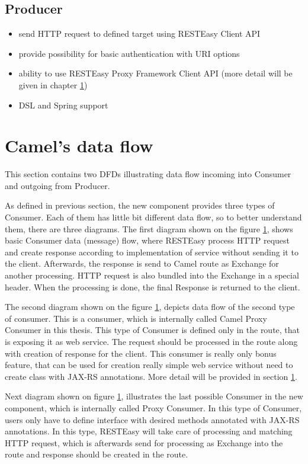 \documentclass[12pt,final,oneside]{fithesis2}
\begin{document}
\subsection{Producer}
\begin{itemize}
\item
send HTTP request to defined target using RESTEasy Client API

\item
provide possibility for basic authentication with URI options

\item
ability to use RESTEasy Proxy Framework Client API (more detail will be given in chapter \ref{})

\item
DSL and Spring support
\end{itemize}

\section{Camel's data flow}
This section contains two DFDs illustrating data flow incoming into Consumer and outgoing from Producer. 

As defined in previous section, the new component provides three types of Consumer. Each of them has little bit different data flow, so to better understand them, there are three diagrams. The first diagram shown on the figure \ref{}, shows basic Consumer data (message) flow, where RESTEasy process HTTP request and create response according to implementation of service without sending it to the client. Afterwards, the response is send to Camel route as Exchange for another processing. HTTP request is also bundled into the Exchange in a special header. When the processing  is done, the final Response is returned to the client. 

The second diagram shown on the figure \ref{}, depicts data flow of the second type of consumer. This is a consumer, which is internally called Camel Proxy Consumer in this thesis. This type of Consumer is defined only in the route, that is exposing it as web service. The request should be processed in the route along with creation of response for the client. This consumer is really only bonus feature, that can be used for creation really simple web service without need to create class with JAX-RS annotations. More detail will be provided in section \ref{}.

Next diagram shown on figure \ref{}, illustrates the last possible Consumer in the new component, which is internally called Proxy Consumer. In this type of Consumer, users only have to define interface with desired methods annotated with JAX-RS annotations. In this type, RESTEasy will take care of processing and matching HTTP request, which is afterwards send for processing as Exchange into the route and response should be created in the route.  
\end{document}
